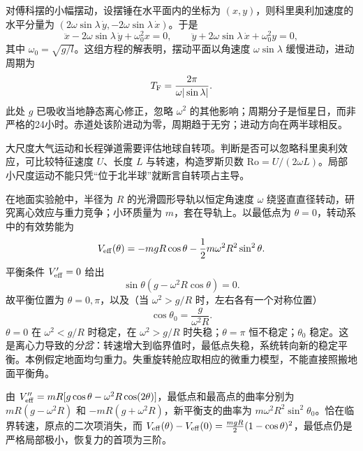 对傅科摆的小幅摆动，设摆锤在水平面内的坐标为 $(x,y)$，则科里奥利加速度的水平分量为 $(2\omega\sin\lambda\,\dot y,-2\omega\sin\lambda\,\dot x)$。于是
\begin{equation}
\ddot x-2\omega\sin\lambda\,\dot y+\omega_0^2x=0,\qquad
\ddot y+2\omega\sin\lambda\,\dot x+\omega_0^2y=0,
\end{equation}
其中 $\omega_0=\sqrt{g/l}$。这组方程的解表明，摆动平面以角速度 $\omega\sin\lambda$ 缓慢进动，进动周期为
\begin{equation}
T_{\rm F}=\frac{2\pi}{\omega|\sin\lambda|}.
\end{equation}
此处 $g$ 已吸收当地静态离心修正，忽略 $\omega^2$ 的其他影响；周期分子是恒星日，而非严格的24小时。赤道处该阶进动为零，周期趋于无穷；进动方向在两半球相反。

\begin{modernbox}
大尺度大气运动和长程弹道需要评估地球自转项。判断是否可以忽略科里奥利效应，可比较特征速度 $U$、长度 $L$ 与转速，构造罗斯贝数 $\mathrm{Ro}=U/(2\omega L)$。局部小尺度运动不能只凭“位于北半球”就断言自转项占主导。
\end{modernbox}

\begin{example}[绕竖直直径旋转的圆环与小珠]
在地面实验舱中，半径为 $R$ 的光滑圆形导轨以恒定角速度 $\omega$ 绕竖直直径转动，研究离心效应与重力竞争；小环质量为 $m$，套在导轨上。以最低点为 $\theta=0$，转动系中的有效势能为
\[
V_{\rm eff}(\theta)=-mgR\cos\theta-\frac12m\omega^2R^2\sin^2\theta.
\]
平衡条件 $V_{\rm eff}'=0$ 给出
\[
\sin\theta\left(g-\omega^2R\cos\theta\right)=0.
\]
故平衡位置为 $\theta=0,\pi$，以及（当 $\omega^2>g/R$ 时，左右各有一个对称位置）
\[
\cos\theta_0=\frac{g}{\omega^2R}.
\]
$\theta=0$ 在 $\omega^2<g/R$ 时稳定，在 $\omega^2>g/R$ 时失稳；$\theta=\pi$ 恒不稳定；$\theta_0$ 稳定。这是离心力导致的\emph{分岔}：转速增大到临界值时，最低点失稳，系统转向新的稳定平衡。本例假定地面均匀重力。失重旋转舱应取相应的微重力模型，不能直接照搬地面平衡角。

由 $V_{\rm eff}''=mR[g\cos\theta-\omega^2R\cos(2\theta)]$，最低点和最高点的曲率分别为 $mR(g-\omega^2R)$ 和 $-mR(g+\omega^2R)$，新平衡支的曲率为 $m\omega^2R^2\sin^2\theta_0$。恰在临界转速，原点的二次项消失，而 $V_{\rm eff}(\theta)-V_{\rm eff}(0)=\frac{mgR}{2}(1-\cos\theta)^2$，最低点仍是严格局部极小，恢复力的首项为三阶。
\end{example}

